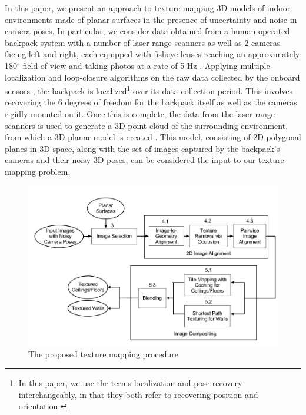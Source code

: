 \documentclass{llncs}
\begin{document}
In this paper, we present an approach to texture mapping 3D models of
indoor environments made of planar surfaces in the presence of
uncertainty and noise in camera poses. In particular, we consider data
obtained from a human-operated backpack system with a number of laser
range scanners as well as 2 cameras facing left and right, each
equipped with fisheye lenses reaching an approximately 180$^{\circ}$
field of view and taking photos at a rate of 5 Hz
\cite{liu2010indoor}. Applying multiple localization and loop-closure
algorithms on the raw data collected by the onboard sensors
\cite{chen2010indoor, kua2012loopclosure, liu2010indoor}, the backpack
is localized\footnote{In this paper, we use the terms localization and
  pose recovery interchangeably, in that they both refer to recovering
  position and orientation.}  over its data collection period. This
involves recovering the 6 degrees of freedom for the backpack itself
as well as the cameras rigidly mounted on it. Once this is complete,
the data from the laser range scanners is used to generate a 3D point
cloud of the surrounding environment, from which a 3D planar model is
created \cite{sanchez2012point}. This model, consisting of 2D
polygonal planes in 3D space, along with the set of images captured by
the backpack's cameras and their noisy 3D poses, can be considered the
input to our texture mapping problem.

\begin{figure}
  \centering
  \includegraphics[width=4.5in]{flowchart.jpg}
  \caption{The proposed texture mapping procedure\\}
  \label{fig:flowchart}
\end{figure}
\end{document}

